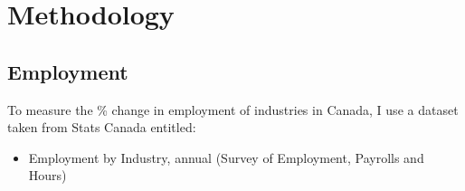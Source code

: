 \documentclass[12pt]{article}
\begin{document}
\newpage

\section{Methodology}

\subsection{Employment}

To measure the \% change in employment of industries in Canada, I use a dataset taken from Stats Canada entitled: 
\begin{itemize}
\item Employment by Industry, annual (Survey of Employment, Payrolls and Hours)
\end{itemize}
\end{document}
